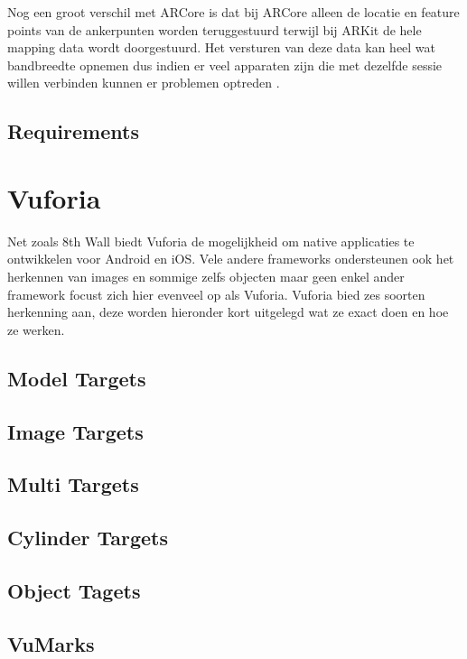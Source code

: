 Nog een groot verschil met ARCore is dat bij ARCore alleen de locatie en feature points van de ankerpunten worden teruggestuurd terwijl bij ARKit de hele mapping data wordt doorgestuurd. Het versturen van deze data kan heel wat bandbreedte opnemen dus indien er veel apparaten zijn die met dezelfde sessie willen verbinden kunnen er problemen optreden \autocite{ARKitMultiuser}.

\subsection{Requirements}

\section{Vuforia}
Net zoals 8th Wall biedt Vuforia de mogelijkheid om native applicaties te ontwikkelen voor Android en iOS. Vele andere frameworks ondersteunen ook het herkennen van images en sommige zelfs objecten maar geen enkel ander framework focust zich hier evenveel op als Vuforia.  
Vuforia bied zes soorten herkenning aan, deze worden hieronder kort uitgelegd wat ze exact doen en hoe ze werken.


\subsection{Model Targets}
\subsection{Image Targets}
\subsection{Multi Targets}
\subsection{Cylinder Targets}
\subsection{Object Tagets}
\subsection{VuMarks}
